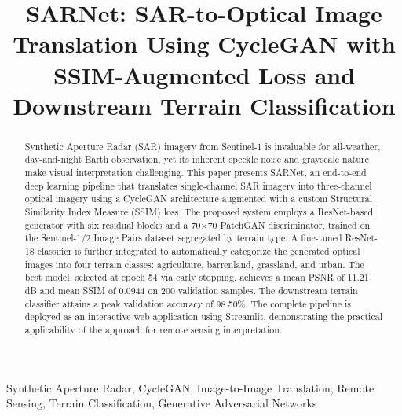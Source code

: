 \documentclass[conference]{IEEEtran}
\begin{document}
\title{SARNet: SAR-to-Optical Image Translation Using CycleGAN with SSIM-Augmented Loss and Downstream Terrain Classification}

\author{
\and
{}
}

\maketitle

\begin{abstract}
Synthetic Aperture Radar (SAR) imagery from Sentinel-1 is invaluable for all-weather, day-and-night Earth observation, yet its inherent speckle noise and grayscale nature make visual interpretation challenging. This paper presents SARNet, an end-to-end deep learning pipeline that translates single-channel SAR imagery into three-channel optical imagery using a CycleGAN architecture augmented with a custom Structural Similarity Index Measure (SSIM) loss. The proposed system employs a ResNet-based generator with six residual blocks and a 70$\times$70 PatchGAN discriminator, trained on the Sentinel-1/2 Image Pairs dataset segregated by terrain type. A fine-tuned ResNet-18 classifier is further integrated to automatically categorize the generated optical images into four terrain classes: agriculture, barrenland, grassland, and urban. The best model, selected at epoch 54 via early stopping, achieves a mean PSNR of 11.21 dB and mean SSIM of 0.0944 on 200 validation samples. The downstream terrain classifier attains a peak validation accuracy of 98.50\%. The complete pipeline is deployed as an interactive web application using Streamlit, demonstrating the practical applicability of the approach for remote sensing interpretation.
\end{abstract}

\begin{IEEEkeywords}
Synthetic Aperture Radar, CycleGAN, Image-to-Image Translation, Remote Sensing, Terrain Classification, Generative Adversarial Networks
\end{IEEEkeywords}
\end{document}
